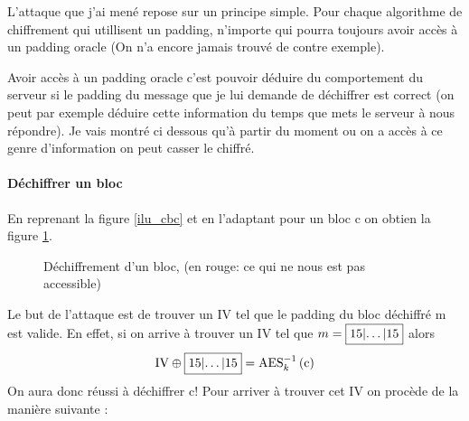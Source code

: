 \documentclass[a4paper, 12pt]{article}
\begin{document}
L'attaque que j'ai mené repose sur un principe simple. Pour chaque algorithme de chiffrement qui utillisent un padding, n'importe qui pourra toujours avoir accès à un padding oracle (On n'a encore jamais trouvé de contre exemple). 

Avoir accès à un padding oracle c'est pouvoir déduire du comportement du serveur si le padding du message que je lui demande de déchiffrer est correct (on peut par exemple déduire cette information du temps que mets le serveur à nous répondre).
Je vais montré ci dessous qu'à partir du moment ou on a accès à ce genre d'information on peut casser le chiffré.

\paragraph{Déchiffrer un bloc}
\noindent En reprenant la figure \ref{ilu_cbc} et en l'adaptant pour un bloc c on obtien la figure \ref{cbcdec1bloc}. 

\begin{figure}[h]
\centering
{}
\caption{Déchiffrement d'un bloc, (en rouge: ce qui ne nous est pas accessible)}
\label{cbcdec1bloc}
\end{figure}

Le but de l'attaque est de trouver un IV tel que le padding du bloc déchiffré m est valide. En effet, si on arrive à trouver un IV tel que $m = \fbox{15|\dots|15}$ alors 
$$ 
\text{IV} \oplus \fbox{15|\dots|15} = \text{AES}^{-1}_{k}\left(\text{c}\right)
$$
On aura donc réussi à déchiffrer c! Pour arriver à trouver cet IV on procède de la manière suivante : \\
\end{document}
